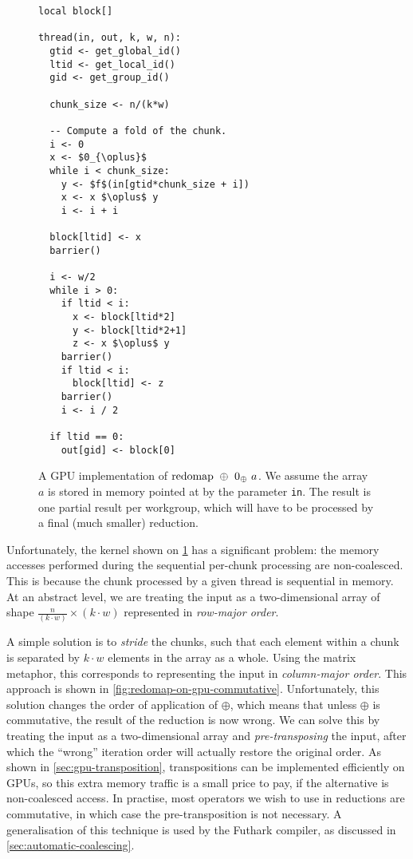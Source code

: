 \begin{figure}

\begin{lstlisting}[language={},mathescape]
local block[]

thread(in, out, k, w, n):
  gtid <- get_global_id()
  ltid <- get_local_id()
  gid <- get_group_id()

  chunk_size <- n/(k*w)

  -- Compute a fold of the chunk.
  i <- 0
  x <- $0_{\oplus}$
  while i < chunk_size:
    y <- $f$(in[gtid*chunk_size + i])
    x <- x $\oplus$ y
    i <- i + i

  block[ltid] <- x
  barrier()

  i <- w/2
  while i > 0:
    if ltid < i:
      x <- block[ltid*2]
      y <- block[ltid*2+1]
      z <- x $\oplus$ y
    barrier()
    if ltid < i:
      block[ltid] <- z
    barrier()
    i <- i / 2

  if ltid == 0:
    out[gid] <- block[0]
\end{lstlisting}

  \caption{A GPU implementation of $\mathrm{redomap}~\oplus~0_{\oplus}~a$.  We
    assume the array $a$ is stored in memory pointed at by the
    parameter \texttt{in}.  The result is one partial result per
    workgroup, which will have to be processed by a final (much
    smaller) reduction.}
  \label{fig:redomap-on-gpu}
\end{figure}

Unfortunately, the kernel shown on \cref{fig:redomap-on-gpu} has a
significant problem: the memory accesses performed during the
sequential per-chunk processing are non-coalesced.  This is because
the chunk processed by a given thread is sequential in memory.  At an
abstract level, we are treating the input as a two-dimensional array
of shape $\frac{n}{(k\cdot{}w)}\times(k\cdot{}w)$ represented in
\textit{row-major order}.

A simple solution is to \textit{stride} the chunks, such that each
element within a chunk is separated by $k\cdot{}w$ elements in the
array as a whole.  Using the matrix metaphor, this corresponds to
representing the input in \textit{column-major order}.  This approach
is shown in \cref{fig:redomap-on-gpu-commutative}.  Unfortunately,
this solution changes the order of application of $\oplus$, which
means that unless $\oplus$ is commutative, the result of the reduction
is now wrong.  We can solve this by treating the input as a
two-dimensional array and \textit{pre-transposing} the input, after
which the ``wrong'' iteration order will actually restore the original
order.  As shown in \cref{sec:gpu-transposition}, transpositions can
be implemented efficiently on GPUs, so this extra memory traffic is a
small price to pay, if the alternative is non-coalesced access.  In
practise, most operators we wish to use in reductions are commutative,
in which case the pre-transposition is not necessary.  A
generalisation of this technique is used by the Futhark compiler, as
discussed in \cref{sec:automatic-coalescing}.

